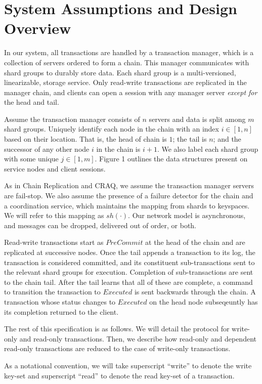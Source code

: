 \documentclass{article}
\begin{document}
\section{System Assumptions and Design Overview}
\par In our system, all transactions are handled by a transaction manager, which is a collection of servers ordered to form a chain. This manager communicates with shard groups to durably store data. Each shard group is a multi-versioned, linearizable, storage service. Only read-write transactions are replicated in the manager chain, and clients can open a session with any manager server \textit{except for} the head and tail. 
\par Assume the transaction manager consists of $n$ servers and data is split among $m$ shard groups. Uniquely identify each node in the chain with an index $i \in [1,n]$ based on their location. That is, the head of chain is $1$; the tail is $n$; and the successor of any other node $i$ in the chain is $i+1$. We also label each shard group with some unique $j \in [1, m]$. Figure 1 outlines the data structures present on service nodes and client sessions. 
\par As in Chain Replication and CRAQ, we assume the transaction manager servers are fail-stop. We also assume the presence of a failure detector for the chain and a coordination service, which maintains the mapping from shards to keyspaces. We will refer to this mapping as $sh(\cdot)$. Our network model is asynchronous, and messages can be dropped, delivered out of order, or both. 
\par Read-write transactions start as $PreCommit$ at the head of the chain and are replicated at successive nodes. Once the tail appends a transaction to its log, the transaction is considered committed, and its constituent sub-transactions sent to the relevant shard groups for execution. Completion of sub-transactions are sent to the chain tail. After the tail learns that all of these are complete, a command to transition the transaction to $Executed$ is sent backwards through the chain. A transaction whose status changes to $Executed$ on the head node subseqeuntly has its completion returned to the client.
\par The rest of this specification is as follows. We will detail the protocol for write-only and read-only transactions. Then, we describe how read-only and dependent read-only transactions are reduced to the case of write-only transactions. 
\par As a notational convention, we will take superscript ``write'' to denote the write key-set and superscript ``read'' to denote the read key-set of a transaction.
\end{document}
